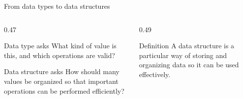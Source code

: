 \documentclass[aspectratio=169]{beamer}
\begin{document}
\begin{frame}{From data types to data structures}
  \begin{columns}[T]
    \begin{column}{0.47\textwidth}
      \begin{block}{Data type asks}
        What kind of value is this, and which operations are valid?
      \end{block}

      \begin{exampleblock}{Data structure asks}
        How should many values be organized so that important operations can
        be performed efficiently?
      \end{exampleblock}
    \end{column}
    \begin{column}{0.49\textwidth}
      \begin{center}
      \end{center}

      \vspace{0.5em}
      \begin{alertblock}{Definition}
        A data structure is a particular way of storing and organizing data so
        it can be used effectively.
      \end{alertblock}
    \end{column}
  \end{columns}
\end{frame}
\end{document}
